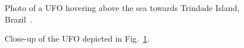 %
\begin{figure}[b]
\sidecaption
%
%
\caption{Photo of a UFO hovering above the sea towards Trindade Island, Brazil~\cite{Trinitate1958Jan}.}

\label{2023-UFO-part-History-photos-1958-tr-c}       %
\end{figure}

%
\begin{figure}[b]
\sidecaption
%
%
\caption{Close-up of the UFO depicted in Fig.~\ref{2023-UFO-part-History-photos-1958-tr-c}.}
\label{2023-UFO-part-History-photos-1958-tr-cu}       %
\end{figure}



\clearpage



